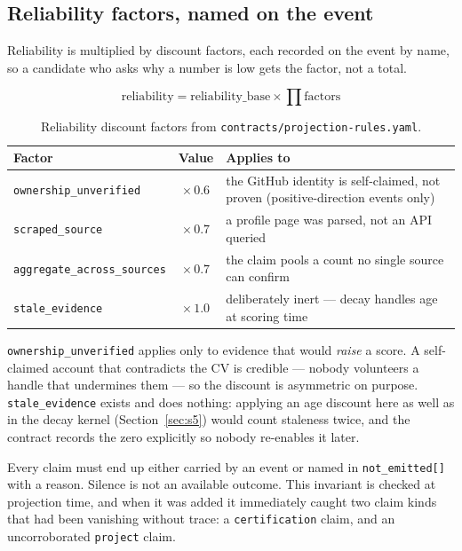 \documentclass[11pt,a4paper]{article}
\newenvironment{keyeq}{%
  \begin{shaded}
  \centering
}{%
  \end{shaded}
}
\newenvironment{notebox}[1]{%
  \def\FrameCommand{{\color{warn}\vrule width 2.4pt}\hspace{9pt}}%
  \MakeFramed{\advance\hsize-\width \FrameRestore}%
  \noindent{\sffamily\footnotesize\bfseries\color{warn}#1}\par\smallskip
  \small
}{%
  \par\endMakeFramed
}
\begin{document}
\subsection*{Reliability factors, named on the event}

Reliability is multiplied by discount factors, each recorded on the event by
name, so a candidate who asks why a number is low gets the factor, not a
total.

\begin{keyeq}
\[
\text{reliability} = \text{reliability\_base} \times \!\!\prod \text{factors}
\]
\end{keyeq}

\begin{table}[H]
\centering\small
\begin{tabular}{@{}lcL{8.3cm}@{}}
\toprule
\textbf{Factor} & \textbf{Value} & \textbf{Applies to} \\
\midrule
\texttt{ownership\_unverified}      & $\times\,0.6$ & the GitHub identity is self-claimed, not proven (positive-direction events only) \\
\texttt{scraped\_source}            & $\times\,0.7$ & a profile page was parsed, not an API queried \\
\texttt{aggregate\_across\_sources} & $\times\,0.7$ & the claim pools a count no single source can confirm \\
\texttt{stale\_evidence}            & $\times\,1.0$ & deliberately inert --- decay handles age at scoring time \\
\bottomrule
\end{tabular}
\caption{Reliability discount factors from
\texttt{contracts/projection-rules.yaml}.}
\end{table}

\texttt{ownership\_unverified} applies only to evidence that would
\emph{raise} a score. A self-claimed account that contradicts the CV is
credible --- nobody volunteers a handle that undermines them --- so the
discount is asymmetric on purpose. \texttt{stale\_evidence} exists and does
nothing: applying an age discount here as well as in the decay kernel
(Section~\ref{sec:s5}) would count staleness twice, and the contract records
the zero explicitly so nobody re-enables it later.

\begin{notebox}{A rule with teeth}
Every claim must end up either carried by an event or named in
\texttt{not\_emitted[]} with a reason. Silence is not an available outcome.
This invariant is checked at projection time, and when it was added it
immediately caught two claim kinds that had been vanishing without trace: a
\texttt{certification} claim, and an uncorroborated \texttt{project} claim.
\end{notebox}
\end{document}
